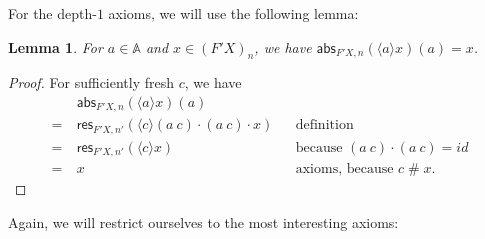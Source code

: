 \documentclass[11pt,a4paper]{amsart}
\newtheorem{lemma}[lemma]{Lemma}
\newcommand{\abs}{\mathsf{abs}}
\newcommand{\res}{\mathsf{res}}
\newcommand{\Names}{\mathbb{A}}
\newcommand{\fresh}{\mathbin{\#}}
\newcommand{\bind}[1]{\langle #1\rangle}
\theoremstyle{plain}
\newcommand{\id}{\mathit{id}}
\numberwithin{equation}{section}
\newcommand{\+}[1]{\mathcal{#1}\xspace}
\theoremstyle{definition}
\begin{document}
For the depth-$1$ axioms, we will use the following lemma:

\begin{lemma}\label{lem:abs-eq}
  For \(a \in \Names\) and \(x \in (F'X)_n\), we have \(\abs_{F'X, n}(\bind{a} x)(a) = x\).
\end{lemma}

\begin{proof}
  For sufficiently fresh \(c\), we have
  \begin{align*}
    &\abs_{F'X, n}(\bind{a} x)(a) \\
    =~&\res_{F'X, n'}(\bind{c}(a\ c) \cdot (a\ c) \cdot x) && \text{definition} \\
    =~&\res_{F'X, n'}(\bind{c} x) && \text{because } (a\ c) \cdot (a\ c) = \id \\
    =~&x && \text{axioms, because } c\fresh x.
  \end{align*}
\end{proof}

Again, we will restrict ourselves to the most interesting axioms:
\end{document}
